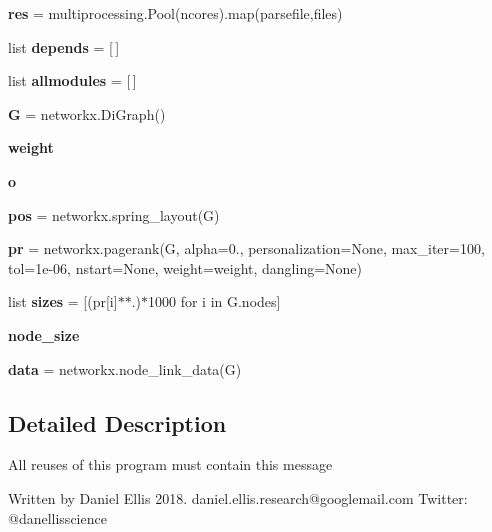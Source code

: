 \begin{DoxyCompactItemize}
{\bfseries res} = multiprocessing.\+Pool(ncores).map(parsefile,files)
\item 
\mbox{\label{namespacemain_a34a8da9e4ea0d649ffa69af902cf521a}} 
list {\bfseries depends} = \mbox{[}$\,$\mbox{]}
\item 
\mbox{\label{namespacemain_aadebc0109a5753a37cb9a31d2ed48cf1}} 
list {\bfseries allmodules} = \mbox{[}$\,$\mbox{]}
\item 
\mbox{\label{namespacemain_abf92d840d5fa38a81ba842df3bb1de98}} 
{\bfseries G} = networkx.\+Di\+Graph()
\item 
\mbox{\label{namespacemain_a9ae7702cafad26b5d092dffe74689ad6}} 
{\bfseries weight}
\item 
\mbox{\label{namespacemain_ae4c7f095ddd008e5b685e83c4d166cc3}} 
{\bfseries o}
\item 
\mbox{\label{namespacemain_a2b72d44d2090c947f5f8a9bbf595f7b4}} 
{\bfseries pos} = networkx.\+spring\+\_\+layout(G)
\item 
\mbox{\label{namespacemain_a4a33a9469e5788aba73f4a5bd96272a1}} 
{\bfseries pr} = networkx.\+pagerank(G, alpha=0., personalization=None, max\+\_\+iter=100, tol=1e-\/06, nstart=\+None, weight=\textquotesingle{}weight\textquotesingle{}, dangling=\+None)
\item 
\mbox{\label{namespacemain_a9f8ea998890504549f6e7371c8337056}} 
list {\bfseries sizes} = \mbox{[}(pr\mbox{[}i\mbox{]}$\ast$$\ast$.)$\ast$1000 for i in G.\+nodes\mbox{]}
\item 
\mbox{\label{namespacemain_a8675ef8ce0b90d4ee43557fb7984d873}} 
{\bfseries node\+\_\+size}
\item 
\mbox{\label{namespacemain_a9582bd76fa0468c20a318f771203f2f6}} 
{\bfseries data} = networkx.\+node\+\_\+link\+\_\+data(G)
\end{DoxyCompactItemize}


\subsection{Detailed Description}
\begin{DoxyVerb}All reuses of this program must contain this message

Written by Daniel Ellis 2018. daniel.ellis.research@googlemail.com
Twitter: @danellisscience
\end{DoxyVerb}
 

